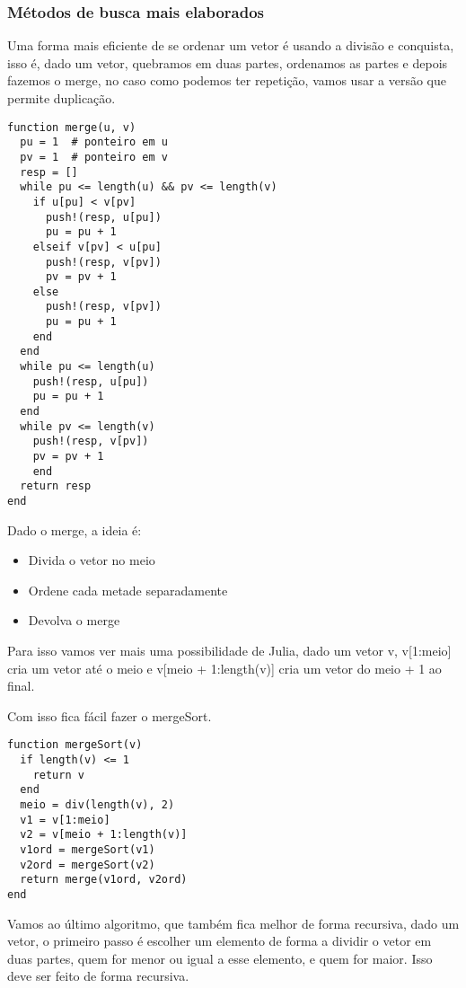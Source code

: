 \documentclass[a4paper]{article}
\begin{document}
\subsubsection{Métodos de busca mais elaborados}
\label{sec:org2be7e9e}

Uma forma mais eficiente de se ordenar um vetor é usando a divisão e conquista,
isso é, dado um vetor, quebramos em duas partes, ordenamos as partes e depois
fazemos o merge, no caso como podemos ter repetição, vamos usar a versão que
permite duplicação.

\lstset{language=ein-julia,label= ,caption= ,captionpos=b,numbers=none}
\begin{lstlisting}
function merge(u, v)
  pu = 1  # ponteiro em u
  pv = 1  # ponteiro em v
  resp = []
  while pu <= length(u) && pv <= length(v)
    if u[pu] < v[pv]
      push!(resp, u[pu])
      pu = pu + 1
    elseif v[pv] < u[pu]
      push!(resp, v[pv])
      pv = pv + 1
    else
      push!(resp, v[pv])
      pu = pu + 1
    end
  end
  while pu <= length(u)
    push!(resp, u[pu])
    pu = pu + 1
  end
  while pv <= length(v)
    push!(resp, v[pv])
    pv = pv + 1
    end
  return resp
end
\end{lstlisting}

Dado o merge, a ideia é:
\begin{itemize}
\item Divida o vetor no meio
\item Ordene cada metade separadamente
\item Devolva o merge
\end{itemize}

Para isso vamos ver mais uma possibilidade de Julia,
dado um vetor v, v[1:meio] cria um vetor até o meio e
v[meio + 1:length(v)] cria um vetor do meio + 1 ao final.

Com isso fica fácil fazer o mergeSort.

\lstset{language=ein-julia,label= ,caption= ,captionpos=b,numbers=none}
\begin{lstlisting}
function mergeSort(v)
  if length(v) <= 1
    return v
  end
  meio = div(length(v), 2)
  v1 = v[1:meio]
  v2 = v[meio + 1:length(v)]
  v1ord = mergeSort(v1)
  v2ord = mergeSort(v2)
  return merge(v1ord, v2ord)
end
\end{lstlisting}

 Vamos ao último algoritmo, que também fica melhor de forma
recursiva, dado um vetor, o primeiro passo é escolher um elemento
 de forma a dividir o vetor em duas partes, quem for menor ou
igual a esse elemento, e quem for maior. Isso deve ser feito
de forma recursiva.
\end{document}
